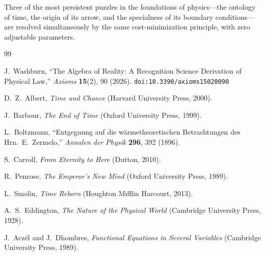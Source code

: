 \documentclass[12pt,a4paper]{article}
\theoremstyle{definition}
\theoremstyle{remark}
\begin{document}
Three of the most persistent puzzles in the foundations of physics---the
ontology of time, the origin of its arrow, and the specialness of its
boundary conditions---are resolved simultaneously by the same
cost-minimization principle, with zero adjustable parameters.

\begin{thebibliography}{99}

J.~Washburn, ``The Algebra of Reality: A Recognition Science Derivation
of Physical Law,'' \emph{Axioms} \textbf{15}(2), 90 (2026).
\texttt{doi:10.3390/axioms15020090}

D.~Z.~Albert, \emph{Time and Chance} (Harvard University Press, 2000).

J.~Barbour, \emph{The End of Time} (Oxford University Press, 1999).

L.~Boltzmann, ``Entgegnung auf die w\"armetheoretischen Betrachtungen des
Hrn.\ E.~Zermelo,'' \emph{Annalen der Physik} \textbf{296}, 392 (1896).

S.~Carroll, \emph{From Eternity to Here} (Dutton, 2010).

R.~Penrose, \emph{The Emperor's New Mind} (Oxford University Press, 1989).

L.~Smolin, \emph{Time Reborn} (Houghton Mifflin Harcourt, 2013).

A.~S.~Eddington, \emph{The Nature of the Physical World}
(Cambridge University Press, 1928).

J.~Acz\'el and J.~Dhombres, \emph{Functional Equations in Several Variables}
(Cambridge University Press, 1989).

\end{thebibliography}
\end{document}
